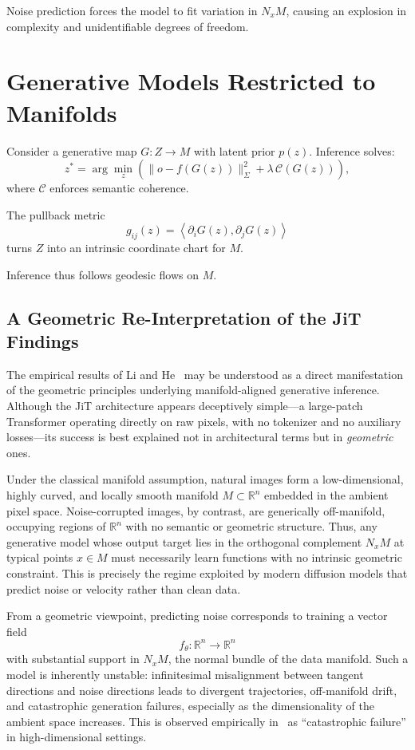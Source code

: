 \documentclass[11pt,a4paper,twocolumn]{article}
\begin{document}
Noise prediction forces the model to fit variation 
in $N_xM$, causing an explosion in complexity
and unidentifiable degrees of freedom.

\section{Generative Models Restricted to Manifolds}

Consider a generative map 
$G : Z \to M$ with latent prior $p(z)$.
Inference solves:
\[
z^\ast = \arg\min_z 
\left(
\|o - f(G(z))\|^2_\Sigma 
+ \lambda\, \mathcal{C}(G(z))
\right),
\]
where $\mathcal{C}$ enforces semantic coherence.

The pullback metric
\[
g_{ij}(z) = 
\left\langle 
\partial_i G(z), 
\partial_j G(z) 
\right\rangle
\]
turns $Z$ into an intrinsic coordinate chart for $M$.

Inference thus follows geodesic flows on $M$.

\subsection{A Geometric Re-Interpretation of the JiT Findings}

The empirical results of Li and He~\cite{li2025backtobasics} may be understood
as a direct manifestation of the geometric principles underlying
manifold-aligned generative inference.
Although the JiT architecture appears deceptively simple---a large-patch
Transformer operating directly on raw pixels, with no tokenizer and no
auxiliary losses---its success is best explained not in architectural terms
but in \emph{geometric} ones.

Under the classical manifold assumption, natural images form a
low-dimensional, highly curved, and locally smooth manifold
$M \subset \mathbb{R}^{n}$ embedded in the ambient pixel space.
Noise-corrupted images, by contrast, are generically off-manifold,
occupying regions of $\mathbb{R}^{n}$ with no semantic or geometric
structure.
Thus, any generative model whose output target lies in the orthogonal
complement $N_x M$ at typical points $x \in M$
must necessarily learn functions with no intrinsic geometric constraint.
This is precisely the regime exploited by modern diffusion models that
predict noise or velocity rather than clean data.

From a geometric viewpoint, predicting noise corresponds to training a
vector field
\[
f_\theta : \mathbb{R}^n \to \mathbb{R}^n
\]
with substantial support in $N_x M$, the normal bundle of the data
manifold.
Such a model is inherently unstable: infinitesimal misalignment between
tangent directions and noise directions leads to divergent trajectories,
off-manifold drift, and catastrophic generation failures, especially as the
dimensionality of the ambient space increases.
This is observed empirically in~\cite{li2025backtobasics} as ``catastrophic
failure'' in high-dimensional settings.
\end{document}
